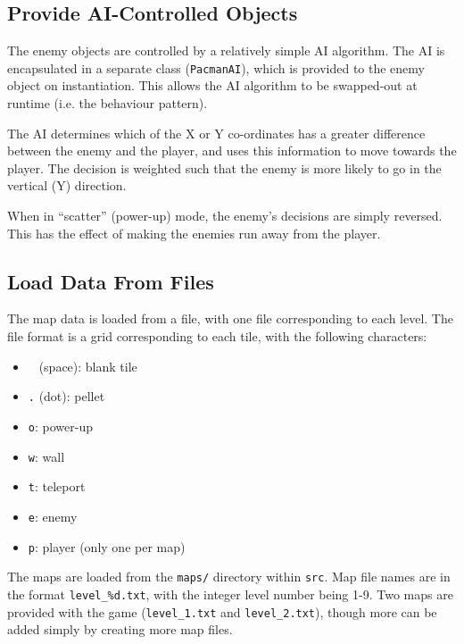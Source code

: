 \documentclass[a4paper,11pt]{article}
\begin{document}
    \subsection{Provide AI-Controlled Objects}

    The enemy objects are controlled by a relatively simple AI algorithm. The
    AI is encapsulated in a separate class (\verb!PacmanAI!), which is provided
    to the enemy object on instantiation. This allows the AI algorithm to be
    swapped-out at runtime (i.e. the behaviour pattern).

    The AI determines which of the X or Y co-ordinates has a greater difference
    between the enemy and the player, and uses this information to move towards
    the player. The decision is weighted such that the enemy is more likely to
    go in the vertical (Y) direction.

    When in ``scatter'' (power-up) mode, the enemy's decisions are simply
    reversed. This has the effect of making the enemies run away from the
    player.

    \newpage

    \subsection{Load Data From Files}

    The map data is loaded from a file, with one file corresponding to each
    level. The file format is a grid corresponding to each tile, with the
    following characters:

    \begin{itemize}
        \item \verb! ! (space): blank tile
        \item \verb!.! (dot): pellet
        \item \verb!o!: power-up
        \item \verb!w!: wall
        \item \verb!t!: teleport
        \item \verb!e!: enemy
        \item \verb!p!: player (only one per map)
    \end{itemize}

    The maps are loaded from the \verb!maps/! directory within \verb!src!. Map
    file names are in the format \verb!level_%d.txt!, with the integer level
    number being 1-9. Two maps are provided with the game (\verb!level_1.txt!
    and \verb!level_2.txt!), though more can be added simply by creating more
    map files.
\end{document}
